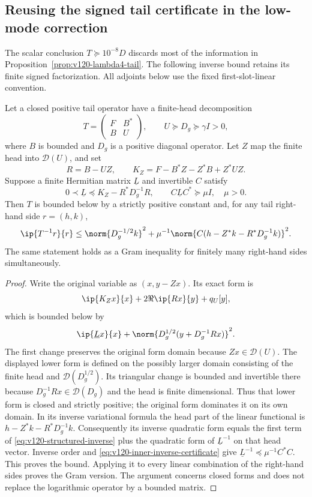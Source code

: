 \subsection*{Reusing the signed tail certificate in the low-mode correction}
The scalar conclusion $T\succeq10^{-8}D$ discards most of the
information in Proposition~\ref{prop:v120-lambda4-tail}. The following
inverse bound retains its finite signed factorization. All adjoints
below use the fixed first-slot-linear convention.

\begin{proposition}
\label{prop:v120-structured-inverse}
Let a closed positive tail operator have a finite-head decomposition
\[
 T=\begin{pmatrix}F&B^*\\ B&U\end{pmatrix},
 \qquad U\succeq D_g\succeq\gamma I>0,
\]
where $B$ is bounded and $D_g$ is a positive diagonal operator.
Let $Z$ map the finite head into $\mathcal D(U)$, and set
\[
 R=B-UZ,\qquad K_Z=F-B^*Z-Z^*B+Z^*UZ.
\]
Suppose a finite Hermitian matrix $\underline L$ and invertible $C$
satisfy
\begin{equation}\label{eq:v120-inner-inverse-certificate}
 0\prec\underline L\preceq K_Z-R^*D_g^{-1}R,
 \qquad C\underline L C^*\succeq\mu I,\quad\mu>0.
\end{equation}
Then $T$ is bounded below by a strictly positive constant and, for
any tail right-hand side $r=(h,k)$,
\begin{equation}\label{eq:v120-structured-inverse}
 \ip{T^{-1}r}{r}
 \le \norm{D_g^{-1/2}k}^2+
 \mu^{-1}\norm{C(h-Z^*k-R^*D_g^{-1}k)}^2.
\end{equation}
The same statement holds as a Gram inequality for finitely many
right-hand sides simultaneously.
\end{proposition}
\begin{proof}
Write the original variable as $(x,y-Zx)$. Its exact form is
\[
 \ip{K_Zx}{x}+2\Re\ip{Rx}{y}+q_U[y],
\]
which is bounded below by
\[
 \ip{\underline Lx}{x}
       +\norm{D_g^{1/2}(y+D_g^{-1}Rx)}^2.
\]
The first change preserves the original form domain because
$Zx\in\mathcal D(U)$. The displayed lower form is defined on the
possibly larger domain consisting of the finite head and
$\mathcal D(D_g^{1/2})$. Its triangular change is bounded and
invertible there because $D_g^{-1}Rx\in\mathcal D(D_g)$ and the
head is finite dimensional. Thus that lower form is closed and
strictly positive; the original form dominates it on its own domain.
In its inverse variational formula the head part of the linear
functional is $h-Z^*k-R^*D_g^{-1}k$. Consequently its inverse
quadratic form equals the first term of
\eqref{eq:v120-structured-inverse} plus the quadratic form of
$\underline L^{-1}$ on that head vector. Inverse order and
\eqref{eq:v120-inner-inverse-certificate} give
$\underline L^{-1}\preceq\mu^{-1}C^*C$. This proves the bound.
Applying it to every linear combination of the right-hand sides
proves the Gram version. The argument concerns closed forms and
does not replace the logarithmic operator by a bounded matrix.
\end{proof}

